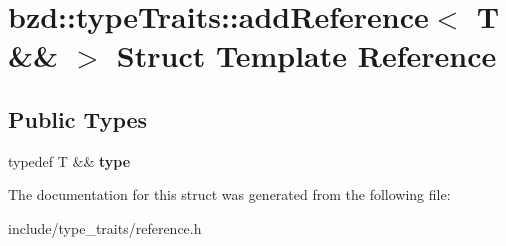 \hypertarget{structbzd_1_1typeTraits_1_1addReference_3_01T_01_6_6_01_4}{}\section{bzd\+:\+:type\+Traits\+:\+:add\+Reference$<$ T \&\& $>$ Struct Template Reference}
\label{structbzd_1_1typeTraits_1_1addReference_3_01T_01_6_6_01_4}
\subsection*{Public Types}
\begin{DoxyCompactItemize}
\item 
\mbox{\label{structbzd_1_1typeTraits_1_1addReference_3_01T_01_6_6_01_4_a9998f768b4d339597101ed044ccf5995}} 
typedef T \&\& {\bfseries type}
\end{DoxyCompactItemize}


The documentation for this struct was generated from the following file\+:\begin{DoxyCompactItemize}
\item 
include/type\+\_\+traits/reference.\+h\end{DoxyCompactItemize}
